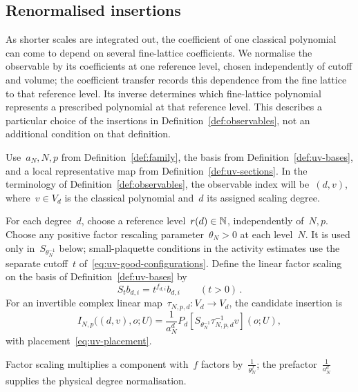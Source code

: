 \subsection{Renormalised insertions}\label{subsec:uv-renormalized}

As shorter scales are integrated out, the coefficient of one classical polynomial can come to depend on several fine-lattice coefficients.
We normalise the observable by its coefficients at one reference level, chosen independently of cutoff and volume; the coefficient transfer records this dependence from the fine lattice to that reference level.
Its inverse determines which fine-lattice polynomial represents a prescribed polynomial at that reference level.
This describes a particular choice of the insertions in Definition~\ref{def:observables}, not an additional condition on that definition.

Use~$a_N,N,p$ from Definition~\ref{def:family}, the basis from Definition~\ref{def:uv-bases}, and a local representative map from Definition~\ref{def:uv-sections}.
In the terminology of Definition~\ref{def:observables}, the observable index will be~$(d,v)$, where~$v\in V_d$ is the classical polynomial and~$d$ its assigned scaling degree.

\begin{definition}\label{def:uv-reference-normalisation}
For each degree~$d$, choose a reference level~$r(d)\in\mathbb N$, independently of~$N,p$.
Choose any positive factor rescaling parameter~$\theta_N>0$ at each level~$N$. It is used only in~$S_{\theta_N^{-1}}$ below; small-plaquette conditions in the activity estimates use the separate cutoff~$t$ of~\eqref{eq:uv-good-configurations}.
Define the linear factor scaling on the basis of Definition~\ref{def:uv-bases} by
\begin{equation}\label{eq:uv-factor-scaling}
 S_t b_{d,i}=t^{f_{d,i}}b_{d,i}\qquad(t>0)\,.
\end{equation}
For an invertible complex linear map~$\tau_{N,p,d}:V_d\to V_d$, the candidate insertion is
\begin{equation}\label{eq:uv-insertion}
 I_{N,p}\bigl((d,v),o;U\bigr)
 =\frac{1}{a_N^d}P_d\!\left[S_{\theta_N^{-1}}\tau_{N,p,d}^{-1}v\right](o;U),
\end{equation}
with placement~\eqref{eq:uv-placement}.
\end{definition}

Factor scaling multiplies a component with~$f$ factors by~$\frac{1}{\theta_N^f}$; the prefactor~$\frac{1}{a_N^d}$ supplies the physical degree normalisation.

